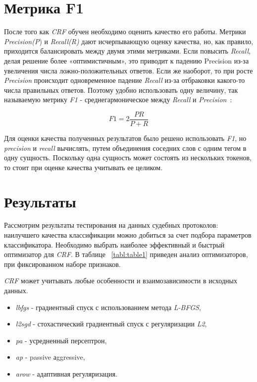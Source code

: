 \documentclass{csmathnotes}
\begin{document}
\section*{Метрика F1}
После того как \emph{CRF} обучен необходимо оценить качество его работы. 
Метрики \emph{Precision(P}) и \emph{Recall(R)} дают исчерпывающую оценку качества, но, как правило, приходится балансировать между двумя этими метриками.
Если повысить \emph{Recall}, делая решение более «оптимистичным», это приводит к падению Precision из-за увеличения числа ложно-положительных ответов.
Если же наоборот, то при росте \emph{Precision} происходит одновременное падение \emph{Recall} из-за отбраковки какого-то числа правильных ответов.
Поэтому удобно использовать одну величину, так называемую метрику \emph{F1} - среднегармоническое между \emph{Recall} и \emph{Precision}~\cite{F1}:

\begin{equation}
F1 = 2\frac{P R}{P + R} 
\end{equation}

Для оценки качества полученных результатов было решено использовать \emph{F1}, но \emph{precision} и \emph{recall} вычислять, путем объединения соседних слов с одним тегом в одну сущность.
Поскольку одна сущность может состоять из нескольких токенов, то стоит при оценке качества учитывать ее целиком. 

\section*{Результаты}
Рассмотрим результаты тестирования на данных судебных протоколов: наилучшего качества классификации можно добиться за счет подбора параметров классификатора. Необходимо выбрать наиболее эффективный и быстрый оптимизатор для \emph{CRF}. В таблице ~\ref{tabl:table1} приведен анализ оптимизаторов, при фиксированном наборе признаков.


\emph{CRF} может учитывать любые особенности и взаимозависимости в исходных данных.
\begin{itemize}
    \item \emph{lbfgs} - градиентный спуск с использованием метода 
    \emph{L-BFGS},
    \item \emph{l2sgd} - стохастический  градиентный спуск с регуляризации \emph{L2},
    \item \emph{pa} - усредненный персептрон,
    \item \emph{ap} - passive аggressive,
    \item \emph{arow} - адаптивная регуляризация.
\end{itemize}
\end{document}

